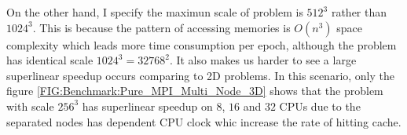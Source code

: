 On the other hand, I specify the maximun scale of problem is $512^3$ rather than $1024^3$. 
This is because the pattern of accessing memories is $O(n^3)$ space complexity which leads more time consumption per epoch, 
although the problem has identical scale $1024^3 = 32768^2$. 
It also makes us harder to see a large superlinear speedup occurs comparing to 2D problems.
In this scenario, only the figure \ref{FIG:Benchmark:Pure_MPI_Multi_Node_3D} shows that the problem with scale $256^3$ has 
superlinear speedup on $8$, $16$ and $32$ CPUs due to the separated nodes has dependent CPU clock whic increase the rate of hitting cache.
\begin{figure} 
  \centering
  \hspace{0em} 
  \hspace{0em} 
\end{figure}
